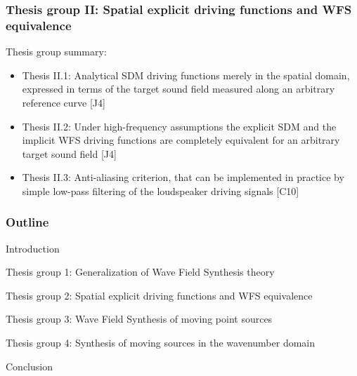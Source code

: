 \documentclass{beamer}
\begin{document}
\begin{frame}
\frametitle{Thesis group II: Spatial explicit driving functions and WFS equivalence}
Thesis group summary:
	\vspace{3mm}
	\begin{itemize}
	\item Thesis II.1: Analytical SDM driving functions merely in the spatial domain, expressed in terms of the target sound field measured along an arbitrary reference curve [J4]	\vspace{3mm}
	\item Thesis II.2: Under high-frequency assumptions the explicit SDM and the implicit WFS driving functions are completely equivalent for an arbitrary target sound field [J4]	\vspace{3mm}
	\item Thesis II.3: Anti-aliasing criterion, that can be implemented in practice by simple low-pass filtering of the loudspeaker driving signals [C10]
	\end{itemize}
\end{frame}
	
\begin{frame}
\frametitle{Outline}
\begin{itemize}
	\item Introduction \vspace{3mm}
	\item Thesis group 1: Generalization of Wave Field Synthesis theory \vspace{3mm}
	\item Thesis group 2: Spatial explicit driving functions and WFS equivalence\vspace{3mm}
	\item {\color{blue} Thesis group 3: Wave Field Synthesis of moving point sources \vspace{3mm}
	\item Thesis group 4: Synthesis of moving sources in the wavenumber domain \vspace{3mm}} 
	\item Conclusion
\end{itemize}
\end{frame}
\end{document}
